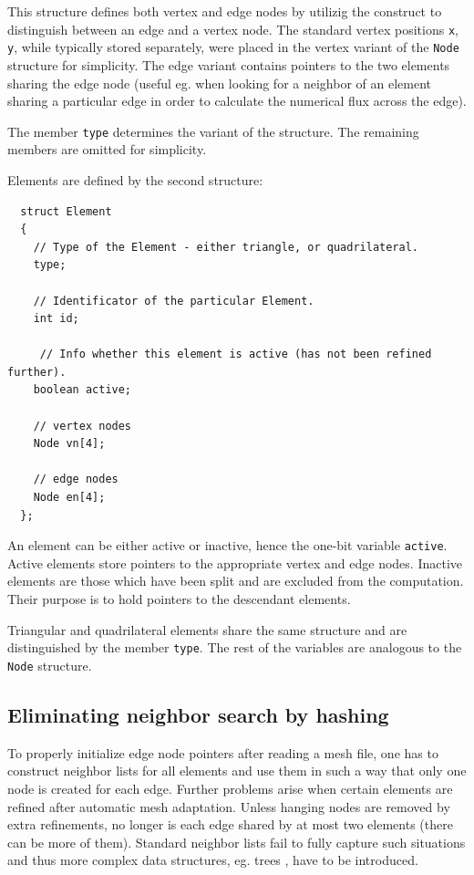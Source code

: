 This structure defines both vertex and edge nodes by utilizig the 
construct to distinguish between an edge and a vertex node. The standard vertex positions {\tt x}, {\tt y},
while typically stored separately, were placed in the vertex variant
of the {\tt Node} structure for simplicity. 
The edge variant contains pointers to the two elements
sharing the edge node (useful eg. when looking for a neighbor of an element sharing a particular edge in order to calculate the numerical flux across the edge).

The member {\tt type} determines the variant of the 
structure. The remaining members are omitted for simplicity.

Elements are defined by the second structure:

\begin{lstlisting}
  struct Element
  {
    // Type of the Element - either triangle, or quadrilateral.
    type;

    // Identificator of the particular Element.
    int id;

	 // Info whether this element is active (has not been refined further).
    boolean active;

    // vertex nodes
    Node vn[4];

    // edge nodes
    Node en[4];
  };
\end{lstlisting}

An element can be either active or inactive, hence the one-bit variable
{\tt active}. Active elements store pointers to the appropriate vertex
and edge nodes. Inactive elements are those which have been split and
are excluded from the computation. Their purpose is to hold pointers
to the descendant elements.

Triangular and quadrilateral elements share the same structure and are
distinguished by the member {\tt type}. The rest of the variables are analogous
to the {\tt Node} structure.

\subsection{Eliminating neighbor search by hashing}
\label{sec:hash}

To properly initialize edge node pointers after reading a mesh file,
one has to construct neighbor lists for all elements and use them in
such a way that only one node is created for each edge. Further
problems arise when certain elements are refined after automatic mesh
adaptation. Unless hanging nodes are removed by extra refinements, no
longer is each edge shared by at most two elements (there can be more of them). Standard neighbor
lists fail to fully capture such situations and thus more complex
data structures, eg. trees \cite{demk1}, have to be introduced.

